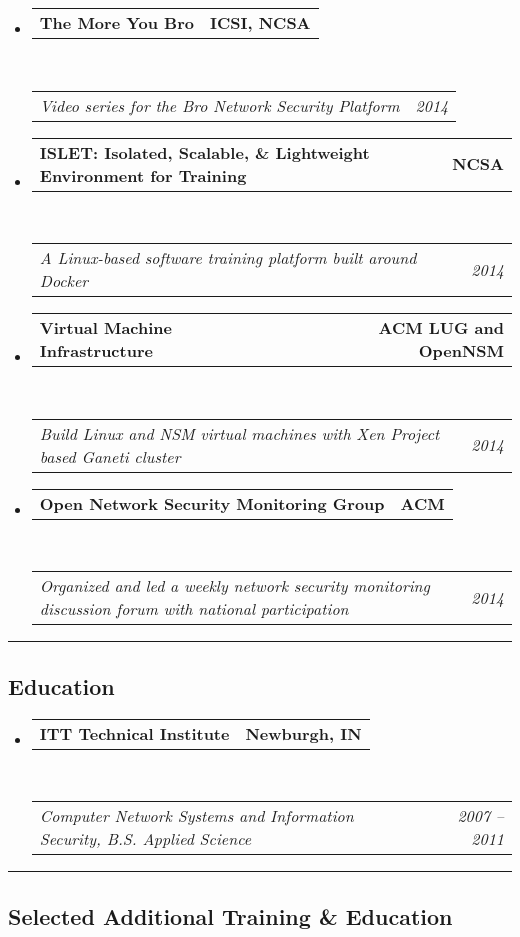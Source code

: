 \documentclass[10pt,letterpaper]{article}
\makeatletter
\newcommand{\headerrow}[2]
{\begin{tabular*}{\linewidth}{l@{\extracolsep{\fill}}r}
	#1 &
	#2 \\
\end{tabular*}}
\makeatother
\begin{document}
\begin{itemize}
	\parskip=0.1em

	\item
	\headerrow
		{\textbf{The More You Bro}}
		{\textbf{ICSI, NCSA}}
	\\
	\headerrow
		{\emph{Video series for the Bro Network Security Platform}}
		{\emph{2014}}

	\item
	\headerrow
		{\textbf{ISLET: Isolated, Scalable, \& Lightweight Environment for Training}}
		{\textbf{NCSA}}
	\\
	\headerrow
		{\emph{A Linux-based software training platform built around Docker}}
		{\emph{2014}}

	\item
	\headerrow
		{\textbf{Virtual Machine Infrastructure}}
		{\textbf{ACM LUG and OpenNSM}}
	\\
	\headerrow
		{\emph{Build Linux and NSM virtual machines with Xen Project based Ganeti cluster}}
		{\emph{2014}}

	\item
	\headerrow
		{\textbf{Open Network Security Monitoring Group}}
		{\textbf{ACM}}
	\\
	\headerrow
		{\emph{Organized and led a weekly network security monitoring discussion forum with national participation}}
		{\emph{2014}}

\end{itemize}

\hrule
\vspace{-0.4em}
\subsection*{Education}

\begin{itemize}
	\parskip=0.1em

	\item
	\headerrow
		{\textbf{ITT Technical Institute}}
		{\textbf{Newburgh, IN}}
	\\
	\headerrow
		{\emph{Computer Network Systems and Information Security, B.S. Applied Science}}
		{\emph{2007 -- 2011}}

\end{itemize}

\hrule
\vspace{-0.4em}

\subsection*{Selected Additional Training \& Education}
\end{document}
